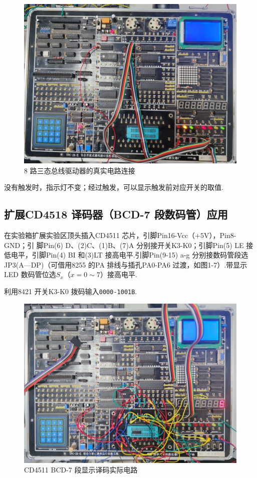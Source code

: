\documentclass[11pt]{SEU-Digital-Report}
\begin{document}
            \begin{figure}[htbp]
                \centering
                \includegraphics[width=.5\linewidth]{fig/3logic_real.jpg}
                \caption{8 路三态总线驱动器的真实电路连接}
                \label{fig:3logic_real}
            \end{figure}

            \begin{analyze}{}{}
                没有触发时，指示灯不变；经过触发，可以显示触发前对应开关的取值.
            \end{analyze}

        \subsection{扩展CD4518 译码器（BCD-7 段数码管）应用}\label{subsec:4518}
            
            在实验箱扩展实验区顶头插入CD4511 芯片，引脚Pin16-Vcc（$+5\mathrm{V}$），Pin8-GND；引
            脚Pin(6) D、(2)C、(1)B、(7)A 分别接开关K3-K0；引脚Pin(5) LE 接低电平，引脚Pin(4) BI
            和(3)LT 接高电平.引脚Pin(9-15) a-g 分别接数码管段选JP3(A---DP)（可借用8255 的PA
            排线与插孔PA0-PA6 过渡，如图1-7）.带显示LED 数码管位选$S_x$（$x=0\sim7$）接高电平.

            利用8421 开关K3-K0 拨码输入\texttt{0000-1001B}.

            \begin{figure}[htbp]
                \centering
                \includegraphics[width=.5\linewidth]{fig/BCD-7-real.jpg}
                \caption{CD4511 BCD-7 段显示译码实际电路}
                \label{fig:bcd7_real}
            \end{figure}
\end{document}
